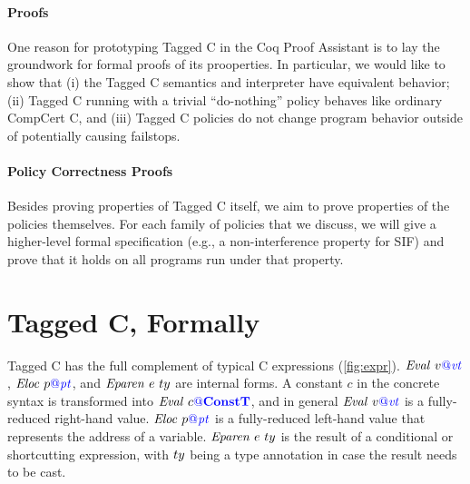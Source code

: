 \documentclass{llncs}
\begin{document}
\paragraph*{Proofs}
One reason for prototyping Tagged C in the Coq Proof Assistant is to lay the groundwork
for formal proofs of its prooperties.  In particular, we would like to show that
(i) the Tagged C semantics and interpreter have equivalent behavior; (ii) Tagged C running
with a trivial ``do-nothing'' policy behaves like ordinary CompCert C, and (iii) Tagged C policies
do not change program behavior outside of potentially causing failstops.

\paragraph*{Policy Correctness Proofs}

Besides proving properties of Tagged C itself, we aim to prove properties of the policies
themselves. For each family of policies that we discuss, we will give a higher-level formal
specification (e.g., a non-interference property for SIF) and prove that it holds on all
programs run under that property.




\appendix


\section{Tagged C, Formally}

Tagged C has the full complement of typical C expressions (\cref{fig:expr}). \(\mathit{Eval} ~ v{\color{blue} @}\mathit{\color{blue} vt}\),
\(\mathit{Eloc} ~ p{\color{blue} @}\mathit{\color{blue} pt}\), and \(\mathit{Eparen} ~ e ~ ty\) are internal forms.
A constant \(c\) in the concrete syntax is transformed into \(\mathit{Eval} ~ c{\color{blue} @}\color{blue} \mathbf{ConstT}\),
and in general \(\mathit{Eval} ~ v{\color{blue} @}\mathit{\color{blue} vt}\) is a fully-reduced right-hand value. \(\mathit{Eloc} ~ p{\color{blue} @}\mathit{\color{blue} pt}\)
is a fully-reduced left-hand value that represents the address of a variable.
\(\mathit{Eparen} ~ e ~ ty\) is the result of a conditional or shortcutting
expression, with \(ty\) being a type annotation in case the result needs to
be cast.
\end{document}
